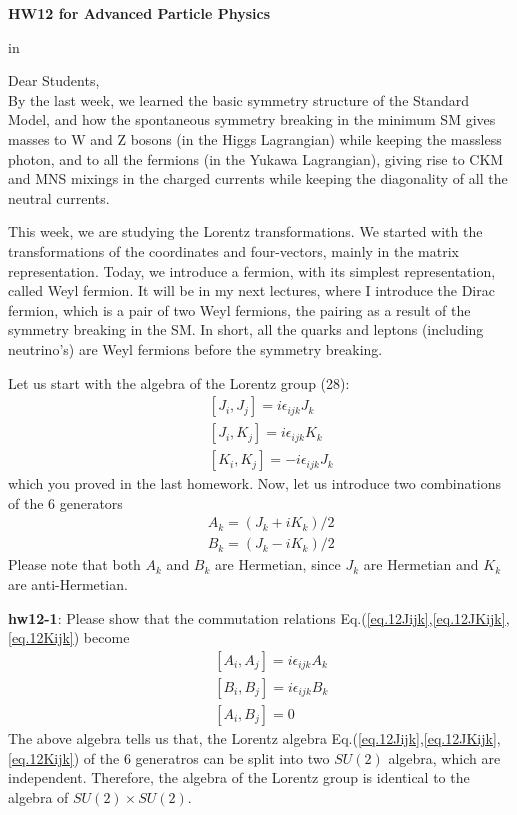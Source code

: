 \documentclass[12pt]{article}
\begin{document}
\begin{center}
{\large\bf HW12 for Advanced Particle Physics} \\

\end{center}

 in

Dear Students,\\

  By the last week, we learned the basic symmetry structure of the
  Standard Model, and how the spontaneous symmetry breaking in the
  minimum SM gives masses to W and Z bosons (in the Higgs Lagrangian)
  while keeping the massless photon, and to all the fermions (in the
  Yukawa Lagrangian), giving rise to CKM and MNS mixings in the charged
  currents while keeping the diagonality of all the neutral currents.

  This week, we are studying the Lorentz transformations. We started
  with the transformations of the coordinates and four-vectors, mainly
  in the matrix representation. Today, we introduce a fermion, with
  its simplest representation, called Weyl fermion. It will be in my
  next lectures, where I introduce the Dirac fermion, which is a pair
  of two Weyl fermions, the pairing as a result of the symmetry breaking
  in the SM.  In short, all the quarks and leptons (including neutrino's)
  are Weyl fermions before the symmetry breaking.

  Let us start with the algebra of the Lorentz group (28):
\begin{eqnarray}
    &&[ J_i, J_j ] =  i \epsilon_{ijk} J_k \label{eq.12Jijk}\\
    &&[ J_i, K_j ] =  i \epsilon_{ijk} K_k \label{eq.12JKijk}\\
    && [ K_i, K_j ] = -i \epsilon_{ijk} J_k \label{eq.12Kijk}
\end{eqnarray}
  which you proved in the last homework. Now, let us introduce two
  combinations of the $6$ generators
\begin{eqnarray}
    &&A_k = (J_k + i K_k)/2 \label{eq.12AJK}\\
    &&B_k = (J_k - i K_k)/2 \label{eq.12BJK}
\end{eqnarray}
  Please note that both $A_k$ and $B_k$ are Hermetian, since $J_k$ are
  Hermetian and $K_k$ are anti-Hermetian.

{\bf hw12-1}: Please show that the commutation relations Eq.(\ref{eq.12Jijk},\ref{eq.12JKijk},\ref{eq.12Kijk}) become
\begin{eqnarray}
    && [ A_i, A_j ] = i \epsilon_{ijk} A_k \label{eq.12Aijk}\\
    && [ B_i, B_j ] = i \epsilon_{ijk} B_k \label{eq.12Bijk}\\
    && [ A_i, B_j ] = 0 \label{eq.12ABijk}
\end{eqnarray}
  The above algebra tells us that, the Lorentz algebra Eq.(\ref{eq.12Jijk},\ref{eq.12JKijk},\ref{eq.12Kijk}) of the
  6 generatros can be split into two $SU(2)$ algebra, which are
  independent. Therefore, the algebra of the Lorentz group is
  identical to the algebra of $SU(2) \times SU(2)$.
\end{document}
